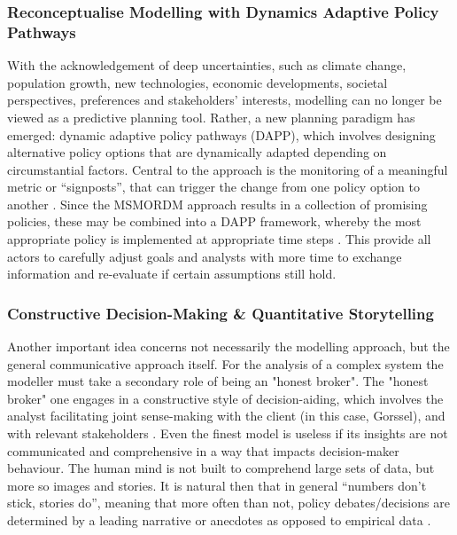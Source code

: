 \subsubsection{Reconceptualise Modelling with Dynamics Adaptive Policy Pathways}

With the acknowledgement of deep uncertainties, such as climate change, population growth, new technologies, economic developments, societal perspectives, preferences and stakeholders’ interests, modelling can no longer be viewed as a predictive planning tool. Rather, a new planning paradigm has emerged: dynamic adaptive policy pathways (DAPP), which involves designing alternative policy options that are dynamically adapted depending on circumstantial factors. Central to the approach is the monitoring of a meaningful metric or “signposts”, that can trigger the change from one policy option to another \parencite{haasnoot_dynamic_2013}. Since the MSMORDM approach results in a collection of promising policies, these may be combined into a DAPP framework, whereby the most appropriate policy is implemented at appropriate time steps \parencite{kwakkel_developing_2015}. This provide all actors to carefully adjust goals and analysts with more time to exchange information and re-evaluate if certain assumptions still hold. 

\subsubsection{Constructive Decision-Making \& Quantitative Storytelling}

Another important idea concerns not necessarily the modelling approach, but the general communicative approach itself. For the analysis of a complex system the modeller must take a secondary role of being an "honest broker". The "honest broker" one engages in a constructive style of decision-aiding, which involves the analyst facilitating joint sense-making with the client (in this case, Gorssel), and with relevant stakeholders \parencite{tsoukias_decision_2008}. Even the finest model is useless if its insights are not communicated and comprehensive in a way that impacts decision-maker behaviour. The human mind is not built to comprehend large sets of data, but more so images and stories. It is natural then that in general “numbers don’t stick, stories do”, meaning that more often than not, policy debates/decisions are determined by a leading narrative or anecdotes as opposed to empirical data \parencite{kettl_making_2016}.  


